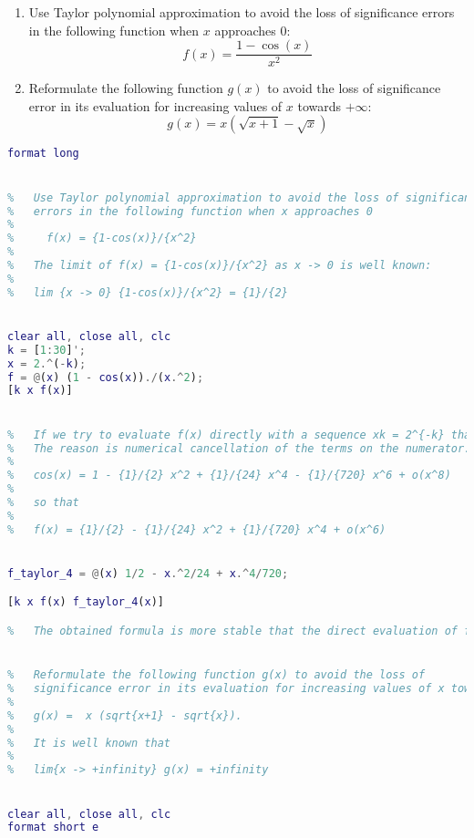 \documentclass[12pt, a4paper]{report}
\newtheorem[style=M,bodystyle=\normalfont]{theorem}{Theorem}
\newtheorem[style=M,bodystyle=\normalfont]{corollary}{Corollary}
\newtheorem[style=M,bodystyle=\normalfont]{lemma}{Lemma}
\newtheorem[style=M,bodystyle=\normalfont]{definition}{Definition}
\begin{document}
    \newpage

    \begin{Exercise}[label=10]
        \begin{enumerate}
            \item Use Taylor polynomial approximation to avoid the loss of significance errors in the following function when $x$ approaches $0$:
                \[f(x)=\dfrac{1-\cos(x)}{x^2}\]
            \item Reformulate the following function $g(x)$ to avoid the loss of significance error in its evaluation for increasing values of $x$ towards $+ \infty$:
                \[g(x)=x \left( \sqrt{x+1} - \sqrt{x} \right)\]
        \end{enumerate}
    \end{Exercise}
    \begin{Answer}[ref=10]
        \begin{lstlisting}[language=Matlab]
format long


% 	Use Taylor polynomial approximation to avoid the loss of significance
% 	errors in the following function when x approaches 0
% 
%     f(x) = {1-cos(x)}/{x^2}
% 
% 	The limit of f(x) = {1-cos(x)}/{x^2} as x -> 0 is well known:
% 
% 	lim {x -> 0} {1-cos(x)}/{x^2} = {1}/{2}


clear all, close all, clc
k = [1:30]';
x = 2.^(-k);
f = @(x) (1 - cos(x))./(x.^2);
[k x f(x)]


% 	If we try to evaluate f(x) directly with a sequence xk = 2^{-k} that approaches 0, we notice anomalous behaviour at k = 13, k = 27, k = ...
% 	The reason is numerical cancellation of the terms on the numerator. We can use Taylor expansion of cos(x) for x -> 0 to obtain a better approximation. Indeed
% 	
% 	cos(x) = 1 - {1}/{2} x^2 + {1}/{24} x^4 - {1}/{720} x^6 + o(x^8)
% 
% 	so that 
% 
% 	f(x) = {1}/{2} - {1}/{24} x^2 + {1}/{720} x^4 + o(x^6)


f_taylor_4 = @(x) 1/2 - x.^2/24 + x.^4/720;

[k x f(x) f_taylor_4(x)]

%	The obtained formula is more stable that the direct evaluation of f(x), and the computed values approach {1}/{2}.


% 	Reformulate the following function g(x) to avoid the loss of
% 	significance error in its evaluation for increasing values of x towards +infinity.
% 	
% 	g(x) =  x (sqrt{x+1} - sqrt{x}).
% 	
% 	It is well known that 
% 	
% 	lim{x -> +infinity} g(x) = +infinity


clear all, close all, clc
format short e


\end{lstlisting}
\end{Answer}
\end{document}
